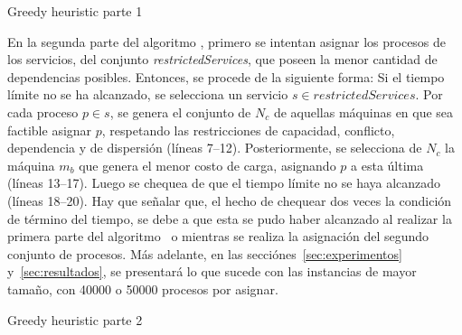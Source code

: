 \documentclass[../informe2.tex]{subfiles}
\begin{document}
\begin{algorithm}[h]
	\caption{Greedy heuristic parte 1}\label{greedy-1}
	\begin{algorithmic}[1]
				\EndIf{}
			\EndFor{}
			\EndIf{}

			\EndIf{}
		\EndFor{}
		\EndProcedure{}
	\end{algorithmic}
\end{algorithm}
\noindent En la segunda parte del algoritmo \greedy, primero se intentan asignar los procesos de los servicios, del conjunto \textit{restrictedServices}, que poseen la menor cantidad de dependencias posibles. Entonces, se procede de la siguiente forma: Si el tiempo límite no se ha alcanzado, se selecciona un servicio $s \in restrictedServices$. Por cada proceso $p \in s$, se genera el conjunto de $N_c$ de aquellas máquinas en que sea factible asignar $p$, respetando las restricciones de capacidad, conflicto, dependencia y de dispersión (líneas 7--12). Posteriormente, se selecciona de $N_c$ la máquina $m_b$ que genera el menor costo de carga, asignando $p$ a esta última (líneas 13--17). Luego se chequea de que el tiempo límite no se haya alcanzado (líneas 18--20). Hay que señalar que, el hecho de chequear dos veces la condición de término del tiempo, se debe a que esta se pudo haber alcanzado al realizar la primera parte del algoritmo \greedy\ o mientras se realiza la asignación del segundo conjunto de procesos. Más adelante, en las secciónes~\ref{sec:experimentos} y~\ref{sec:resultados}, se presentará lo que sucede con las instancias de mayor tamaño, con 40000 o 50000 procesos por asignar.\\

\begin{algorithm}[h]
	\caption{Greedy heuristic parte 2}\label{greedy-2}
	\begin{algorithmic}[1]
			\EndIf{}
					\EndIf{}
				\EndFor{}
				\EndIf{}
				\EndIf{}
			\EndFor{}
		\EndFor{}
		\EndProcedure{}
	\end{algorithmic}
\end{algorithm}
\end{document}
